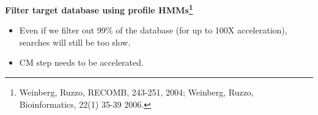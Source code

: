 \documentclass[landscape]{slides}
\begin{document}
\begin{slide}
\begin{slide}

\vfill
\end{slide}
\begin{slide}
\begin{center}
\large
\textbf{Filter target database using profile HMMs\footnote{Weinberg,
    Ruzzo, RECOMB, 243-251, 2004; Weinberg, Ruzzo, Bioinformatics,
    22(1) 35-39 2006.}}
\end{center}


\begin{itemize}
\item Even if we filter out 99\% of the database (for up to 100X
  acceleration), searches will still be too slow.
\item CM step needs to be accelerated. 
\end{itemize}


\end{slide}
\end{slide}
\end{document}
